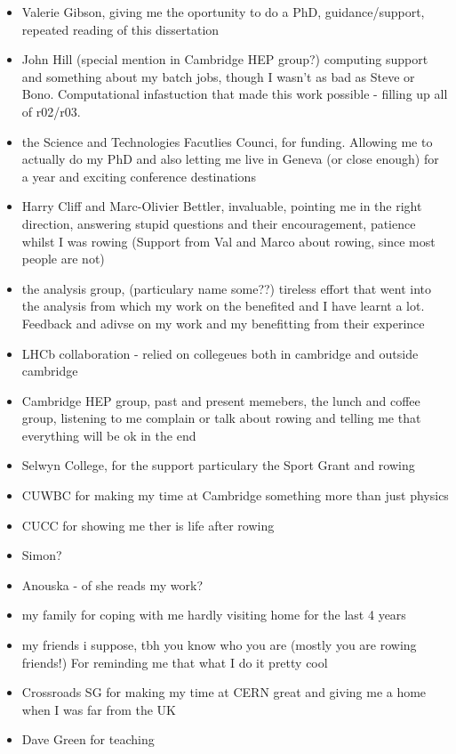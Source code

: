 \begin{itemize}
\item Valerie Gibson, giving me the oportunity to do a PhD, guidance/support, repeated reading of this dissertation
\item John Hill (special mention in Cambridge HEP group?) computing support and something about my batch jobs, though I wasn't as bad as Steve or Bono. Computational infastuction that made this work possible - filling up all of r02/r03.
\item the Science and Technologies Facutlies Counci, for funding. Allowing me to actually do my PhD and also letting me live in Geneva (or close enough) for a year and exciting conference destinations
\item Harry Cliff and Marc-Olivier Bettler, invaluable, pointing me in the right direction, answering stupid questions and their encouragement, patience whilst I was rowing (Support from Val and Marco about rowing, since most people are not)
\item the \bmumu analysis group, (particulary name some??) tireless effort that went into the \BF analysis from which my work on the \el benefited and I have learnt a lot. Feedback and adivse on my work and my benefitting from their experince
\item LHCb collaboration - relied on collegeues both in cambridge and outside cambridge
\item Cambridge HEP group, past and present memebers, the lunch and coffee group, listening to me complain or talk about rowing and telling me that everything will be ok in the end
\item Selwyn College, for the support particulary the Sport Grant and rowing
\item CUWBC for making my time at Cambridge something more than just physics
\item CUCC for showing me ther is life after rowing
\item Simon?
\item Anouska - of she reads my work?
\item my family for coping with me hardly visiting home for the last 4 years
\item my friends i suppose, tbh you know who you are (mostly you are rowing friends!) For reminding me that what I do it pretty cool
\item Crossroads SG for making my time at CERN great and giving me a home when I was far from the UK
\item Dave Green for teaching
\end{itemize}
